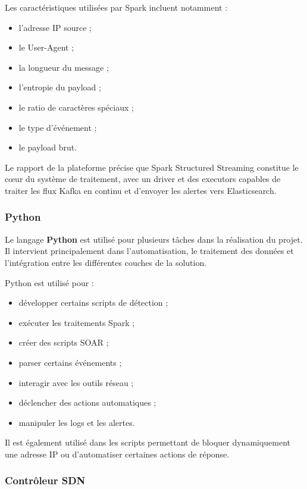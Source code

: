 \documentclass[12pt,a4paper,oneside]{report}
\begin{document}
	Les caractéristiques utilisées par Spark incluent notamment :
	
	\begin{itemize}
		\item l'adresse IP source ;
		\item le User-Agent ;
		\item la longueur du message ;
		\item l'entropie du payload ;
		\item le ratio de caractères spéciaux ;
		\item le type d'événement ;
		\item le payload brut.
	\end{itemize}
	
	Le rapport de la plateforme précise que Spark Structured Streaming constitue le cœur du système de traitement, avec un driver et des executors capables de traiter les flux Kafka en continu et d'envoyer les alertes vers Elasticsearch.
	
	\subsubsection{Python}
	
	Le langage \textbf{Python} est utilisé pour plusieurs tâches dans la réalisation du projet. Il intervient principalement dans l'automatisation, le traitement des données et l'intégration entre les différentes couches de la solution.
	
	Python est utilisé pour :
	
	\begin{itemize}
		\item développer certains scripts de détection ;
		\item exécuter les traitements Spark ;
		\item créer des scripts SOAR ;
		\item parser certains événements ;
		\item interagir avec les outils réseau ;
		\item déclencher des actions automatiques ;
		\item manipuler les logs et les alertes.
	\end{itemize}
	
	Il est également utilisé dans les scripts permettant de bloquer dynamiquement une adresse IP ou d'automatiser certaines actions de réponse.
	
	\subsubsection{Contrôleur SDN}
	
\end{document}
